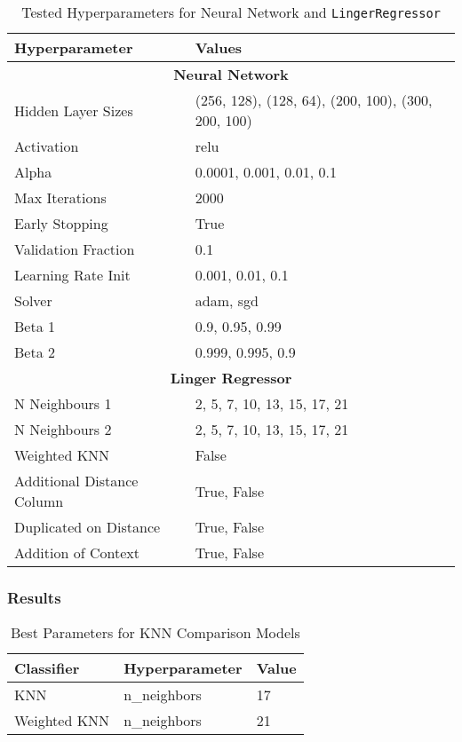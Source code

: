 \documentclass[a4paper, 12pt]{report}
\begin{document}
\begin{table}[H]
    \centering
    \caption{Tested Hyperparameters for Neural Network and \texttt{LingerRegressor}}
    \label{tab:hyperparameters_abalone}
    \begin{tabular}{|l|l|}
    \hline
    \textbf{Hyperparameter} & \textbf{Values} \\ \hline
    \multicolumn{2}{|c|}{\textbf{Neural Network}} \\ \hline
    Hidden Layer Sizes & (256, 128), (128, 64), (200, 100), (300, 200, 100) \\ \hline
    Activation & relu \\ \hline
    Alpha & 0.0001, 0.001, 0.01, 0.1 \\ \hline
    Max Iterations & 2000 \\ \hline
    Early Stopping & True \\ \hline
    Validation Fraction & 0.1 \\ \hline
    Learning Rate Init & 0.001, 0.01, 0.1 \\ \hline
    Solver & adam, sgd \\ \hline
    Beta 1 & 0.9, 0.95, 0.99 \\ \hline
    Beta 2 & 0.999, 0.995, 0.9 \\ \hline
    \multicolumn{2}{|c|}{\textbf{Linger Regressor}} \\ \hline
    N Neighbours 1 & 2, 5, 7, 10, 13, 15, 17, 21 \\ \hline
    N Neighbours 2 & 2, 5, 7, 10, 13, 15, 17, 21 \\ \hline
    Weighted KNN & False \\ \hline
    Additional Distance Column & True, False \\ \hline
    Duplicated on Distance & True, False \\ \hline
    Addition of Context & True, False \\ \hline
    \end{tabular}
\end{table}
\clearpage

\subsubsection{Results}

\begin{table}[H]
    \centering
    \caption{Best Parameters for KNN Comparison Models}
    \label{tab:best_parameters_combined_knn_exp2}
    \begin{tabular}{|l|l|l|}
    \toprule
    \textbf{Classifier} & \textbf{Hyperparameter} & \textbf{Value} \\
    \midrule
    KNN & n\_neighbors & 17 \\
    Weighted KNN & n\_neighbors & 21 \\
    \bottomrule
\end{tabular}
\end{table}
\end{document}
